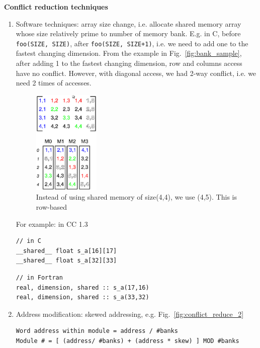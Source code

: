 {\bf Conflict reduction techniques}
\begin{enumerate}
\item Software techniques: array size change, i.e. allocate shared
  memory array whose size relatively prime to number of memory
  bank. E.g. in C, before \verb!foo(SIZE, SIZE)!, after
  \verb!foo(SIZE, SIZE+1)!, i.e.  we need to add one to the fastest
  changing dimension. From the example in Fig.~\ref{fig:bank_sample},
  after adding 1 to the fastest changing dimension, row and columns
  access have no conflict. However, with diagonal access, we had 2-way
  conflict, i.e. we need 2 times of accesses.

  \begin{figure}[hbt]
    \centerline{\includegraphics[height=5cm,
      angle=0]{./images/conflict_reduce_1.eps}}
    \caption{Instead of using shared memory of size(4,4), we use
      (4,5). This is row-based }
    \label{fig:conflict_reduce_1}
  \end{figure}

  For example: in CC 1.3
\begin{lstlisting}
// in C
__shared__ float s_a[16][17]
__shared__ float s_a[32][33]
\end{lstlisting}
\begin{lstlisting}
// in Fortran
real, dimension, shared :: s_a(17,16)
real, dimension, shared :: s_a(33,32)
\end{lstlisting}
\item Address modification: skewed addressing,
  e.g. Fig.~\ref{fig:conflict_reduce_2}
\begin{verbatim}
Word address within module = address / #banks
Module # = [ (address/ #banks) + (address * skew) ] MOD #banks
\end{verbatim}


\end{enumerate}
